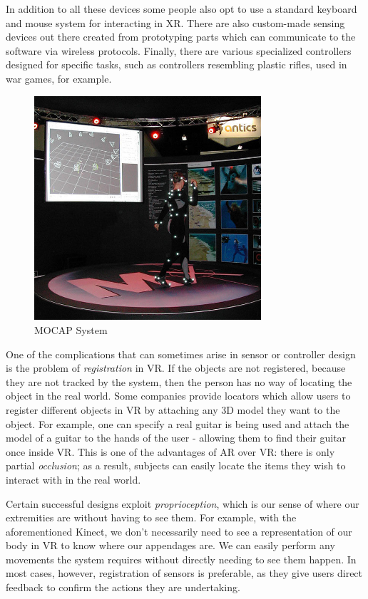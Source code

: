 In addition to all these devices some people also opt to use a standard keyboard and mouse system for interacting in XR. There are also custom-made sensing devices out there created from prototyping parts which can communicate to the software via wireless protocols. Finally, there are various specialized controllers designed for specific tasks, such as controllers resembling plastic rifles, used in war games, for example.

\begin{figure}[ht!]%
\centering
\includegraphics[width=0.75\textwidth]{img/mocap.jpg} 
\caption{MOCAP System \cite{FileMoti99online}}
\label{img:mocap}
\end{figure}

One of the complications that can sometimes arise in sensor or controller design is the problem of \textit{registration} in VR. If the objects are not registered, because they are not tracked by the system, then the person has no way of locating the object in the real world. Some companies provide locators which allow users to register different objects in VR by attaching any 3D model they want to the object. For example, one can specify a real guitar is being used and attach the model of a guitar to the hands of the user - allowing them to find their guitar once inside VR. This is one of the advantages of AR over VR: there is only partial \textit{occlusion}; as a result, subjects can easily locate the items they wish to interact with in the real world.

Certain successful designs exploit \textit{proprioception}, which is our sense of where our extremities are without having to see them. For example, with the aforementioned Kinect, we don't necessarily need to see a representation of our body in VR to know where our appendages are. We can easily perform any movements the system requires without directly needing to see them happen. In most cases, however, registration of sensors is preferable, as they give users direct feedback to confirm the actions they are undertaking. 

